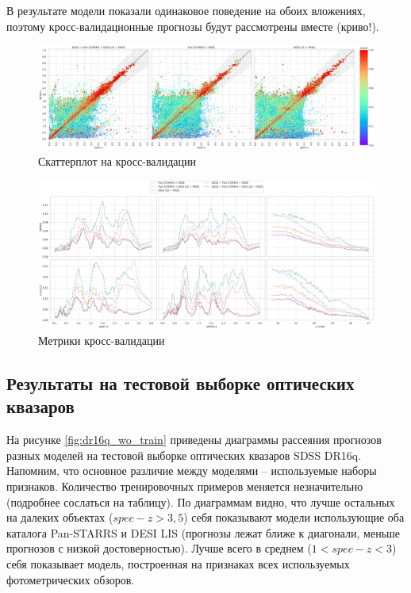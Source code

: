 \documentclass[fleqn,usenatbib]{mnras}
\begin{document}
В результате модели показали одинаковое поведение на обоих вложениях, поэтому кросс-валидационные прогнозы будут рассмотрены вместе (криво!).

\begin{figure}
    \centering
    \includegraphics[width=0.9\linewidth]{images/scatterplots-cv2-total.png}
    \caption{Скаттерплот на кросс-валидации}
    \label{fig:my_label}
\end{figure}

\begin{figure}
    \centering
    \includegraphics[width=0.9\linewidth]{images/metrics-cv2-ab-mini.png}
    \caption{Метрики кросс-валидации}
    \label{fig:metrics-cv2-ab}
\end{figure}

\subsection{Результаты на тестовой выборке оптических квазаров}

На рисунке \ref{fig:dr16q_wo_train} приведены диаграммы рассеяния прогнозов разных моделей на тестовой выборке оптических квазаров SDSS DR16q. Напомним, что основное различие между моделями -- используемые наборы признаков. Количество тренировочных примеров меняется незначительно (подробнее сослаться на таблицу). По диаграммам видно, что  лучше остальных на далеких объектах ($spec-z > 3,5$) себя показывают модели использующие оба каталога Pan-STARRS и DESI LIS (прогнозы лежат ближе к диагонали, меньше прогнозов с низкой достоверностью). Лучше всего в среднем ($1 < spec-z < 3$) себя показывает модель, построенная на признаках всех используемых фотометрических обзоров.
\end{document}
